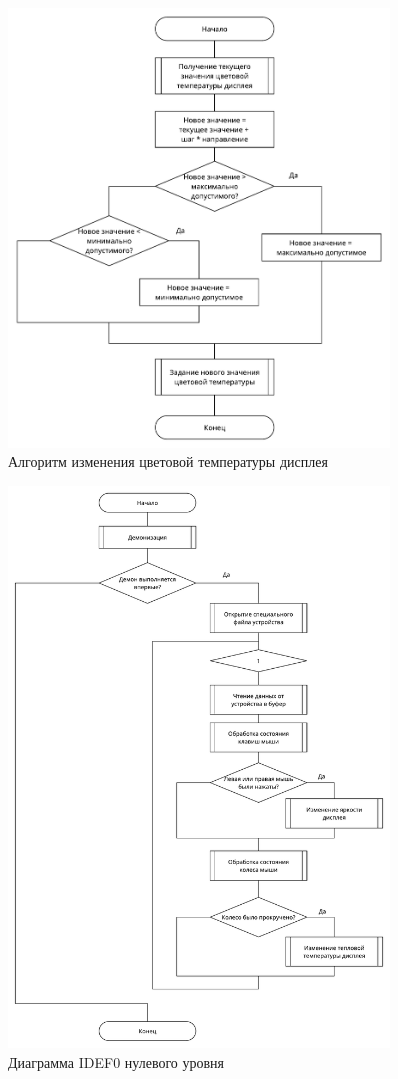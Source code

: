 \begin{figure}[!htb]\centering
	\includegraphics[width=0.9\textwidth]{../img/night_light_temp.pdf}
	\caption{Алгоритм изменения цветовой температуры дисплея}
	\label{img:night_light_temp}
\end{figure}

\begin{figure}[!htb]\centering
	\includegraphics[width=0.9\textwidth]{../img/daemon.pdf}
	\caption{Диаграмма IDEF0 нулевого уровня}
	\label{img:daemon}
\end{figure}
